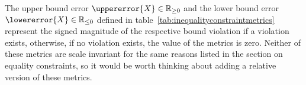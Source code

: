 The upper bound error $\uppererror{X} \in \mathbb{R}_{\ge 0}$ and
the lower bound error $\lowererror{X} \in \mathbb{R}_{\le 0}$ defined
in table~\ref{tab:inequalityconstraintmetrics} represent the signed
magnitude of the respective bound violation if a violation exists, otherwise,
if no violation exists, the value of the metrics is zero.
Neither of these metrics are scale invariant for the same reasons listed in the
section on equality constraints, so it would be worth thinking about adding
a relative version of these metrics.